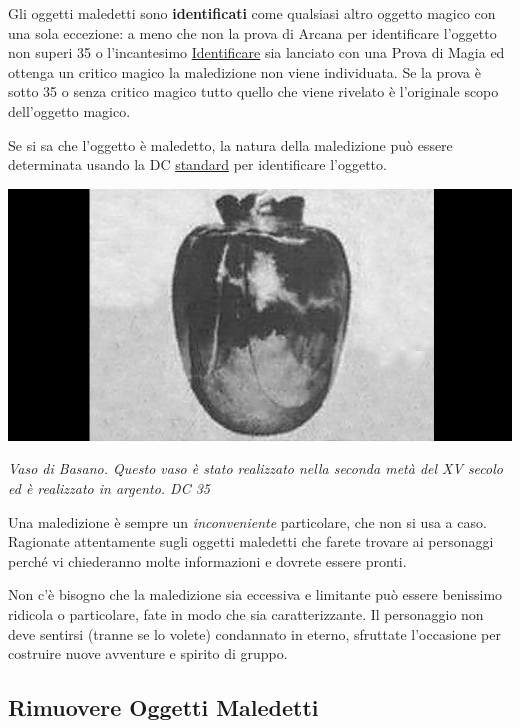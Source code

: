 \begin{multicols}{2}
\medskip

Gli oggetti maledetti sono \hypertarget{oggettimaledettiid}{\textbf{identificati}}\label{oggettimaledettiid} come qualsiasi altro oggetto magico con una sola eccezione: a meno che non la prova di Arcana per identificare l'oggetto non superi 35 o l'incantesimo \hyperlink{Identificare}{Identificare} sia lanciato con una Prova di Magia ed ottenga un critico magico la maledizione non viene individuata. Se la prova è sotto 35 o senza critico magico tutto quello che viene rivelato è l'originale scopo dell'oggetto magico.

Se si sa che l'oggetto è maledetto, la natura della maledizione può essere determinata usando la DC \hyperlink{identificareom}{standard} per identificare l'oggetto.

\begin{center}
\includegraphics[width=0.75\linewidth]{immagini/vasobasano.png}

\emph{Vaso di Basano. Questo vaso è stato realizzato nella seconda metà del XV secolo ed è realizzato in argento. DC 35}
\end{center}

\begin{narratore}
Una maledizione è sempre un \emph{inconveniente} particolare, che non si usa a caso. Ragionate attentamente sugli oggetti maledetti che farete trovare ai personaggi perché vi chiederanno molte informazioni e dovrete essere pronti.

Non c'è bisogno che la maledizione sia eccessiva e limitante può essere benissimo ridicola o particolare, fate in modo che sia caratterizzante. Il personaggio non deve sentirsi (tranne se lo volete) condannato in eterno, sfruttate l'occasione per costruire nuove avventure e spirito di gruppo.
\end{narratore}

\subsection{Rimuovere Oggetti Maledetti}


\end{multicols}
